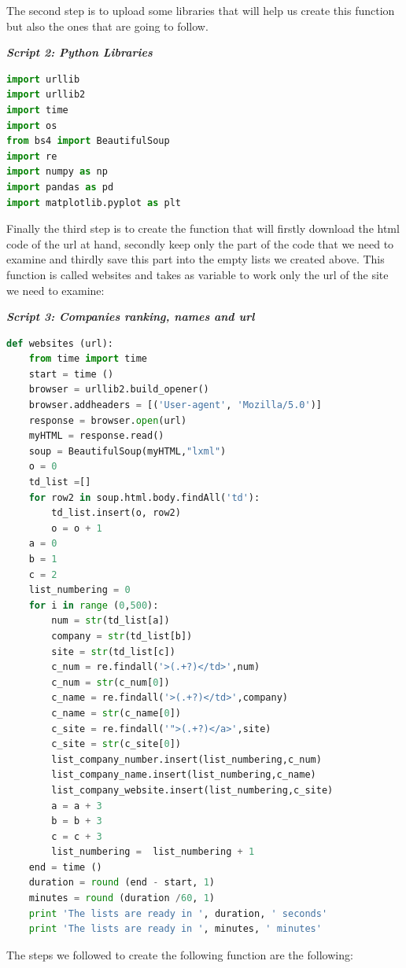\documentclass{article}
\begin{document}
The second step is to upload some libraries that will help us create this function but also the ones that are going to follow.
\begin{center}
\textit{\textbf{Script 2: Python Libraries}}
\end{center}
\begin{lstlisting}[language=Python]
import urllib
import urllib2
import time
import os
from bs4 import BeautifulSoup
import re
import numpy as np
import pandas as pd
import matplotlib.pyplot as plt
\end{lstlisting}
Finally the third step is to create the function that will firstly download the html code of the url at hand, secondly keep only the part of the code that we need to examine and thirdly save this part into the empty lists we created above. This function is called websites and takes as variable to work only the url of the site we need to examine: 
\begin{center}
\textit{\textbf{Script 3: Companies ranking, names and url}}
\end{center}
\begin{lstlisting}[language=Python]
def websites (url): 
    from time import time
    start = time ()
    browser = urllib2.build_opener() 
    browser.addheaders = [('User-agent', 'Mozilla/5.0')]
    response = browser.open(url)
    myHTML = response.read()
    soup = BeautifulSoup(myHTML,"lxml")    
    o = 0
    td_list =[]
    for row2 in soup.html.body.findAll('td'):
        td_list.insert(o, row2)
        o = o + 1
    a = 0
    b = 1
    c = 2
    list_numbering = 0
    for i in range (0,500):        
        num = str(td_list[a])
        company = str(td_list[b])
        site = str(td_list[c])
        c_num = re.findall('>(.+?)</td>',num)  
        c_num = str(c_num[0])
        c_name = re.findall('>(.+?)</td>',company)
        c_name = str(c_name[0])
        c_site = re.findall('">(.+?)</a>',site)
        c_site = str(c_site[0])        
        list_company_number.insert(list_numbering,c_num)
        list_company_name.insert(list_numbering,c_name)
        list_company_website.insert(list_numbering,c_site)
        a = a + 3
        b = b + 3
        c = c + 3
        list_numbering =  list_numbering + 1 
    end = time ()
    duration = round (end - start, 1)
    minutes = round (duration /60, 1)
    print 'The lists are ready in ', duration, ' seconds'
    print 'The lists are ready in ', minutes, ' minutes'
\end{lstlisting}
The steps we followed to create the following function are the following:
\end{document}
